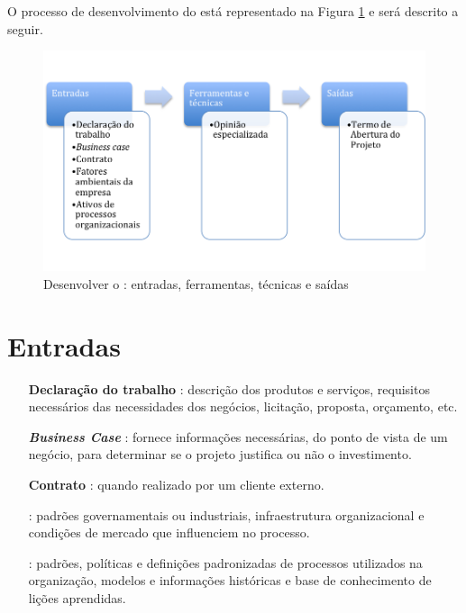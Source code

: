 O processo de desenvolvimento do \termo está representado na Figura \ref{fig:TAP:efts} e será descrito a seguir.

\begin{figure}[!h]
	\centering
	\includegraphics[scale=0.75]{Figuras/TAP_efts.png}
	\caption{Desenvolver o \termo: entradas, ferramentas, técnicas e saídas}
	\label{fig:TAP:efts}
\end{figure}

\section{Entradas}

\begin{itemize}
	
	\item[\textbf{Declaração do trabalho}]: descrição dos produtos e serviços, requisitos necessários das necessidades dos negócios, licitação, proposta, orçamento, etc.
	
	\item[\textbf{\textit{Business Case}}]: fornece informações necessárias, do ponto de vista de um negócio, para determinar se o projeto justifica ou não o investimento. 
	
	\item[\textbf{Contrato}]: quando realizado por um cliente externo.
	
	\item[\textbf{\amb}]: padrões governamentais ou industriais, infraestrutura organizacional e condições de mercado que influenciem no processo.
	
	\item[\textbf{\ativ}]: padrões, políticas e definições padronizadas de processos utilizados na organização, modelos e informações históricas e base de conhecimento de lições aprendidas.
	 
\end{itemize}

